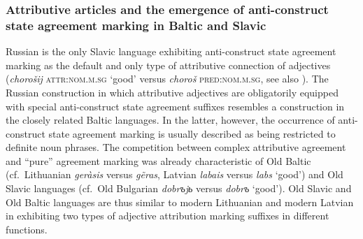 \subsubsection[Baltic and Slavic]{Attributive articles and the emergence of anti-construct state agreement marking in Baltic and Slavic} \label{slavic diachr}


Russian is the only Slavic language exhibiting anti-construct state agreement marking as the default and only type of attributive connection of adjectives (\textit{chorošij} \textsc{attr:nom.m.sg} ‘good’ versus \textit{choroš} \textsc{pred:nom.m.sg}, see also ). The Russian construction in which attributive adjectives are obligatorily equipped with special anti-construct state agreement suffixes resembles a construction in the closely related Baltic languages. In the latter, however, the occurrence of anti-construct state agreement marking is usually described as being restricted to definite noun phrases. The competition between complex attributive agreement and “pure” agreement marking was  already characteristic of Old Baltic (cf.~Lithuanian \textit{geràsis} versus \textit{g{\~e}ras}, Latvian \textit{labais} versus \textit{labs} ‘good’) and Old Slavic languages (cf.~Old Bulgarian \textit{dobrъjь} versus \textit{dobrъ} ‘good’). Old Slavic and Old Baltic languages are thus similar to modern Lithuanian and modern Latvian in exhibiting two types of adjective attribution marking suffixes in different functions.

